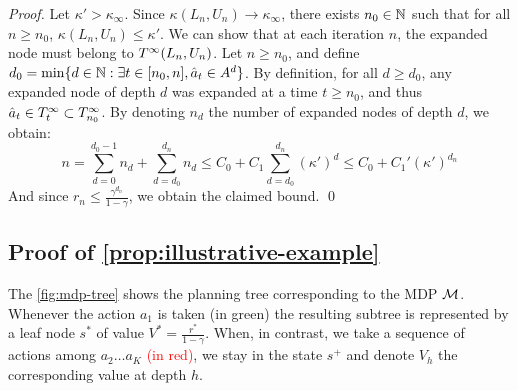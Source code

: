 \documentclass[runningheads]{llncs}
\begin{document}
\begin{proof}
Let $\kappa'>\kappa_\infty$. Since $\kappa(L_n,U_n)\rightarrow\kappa_\infty$, there exists $n_0\in\mathbb{N}$ such that for all $n\geq n_0$, $\kappa(L_n,U_n) \leq \kappa'$.
We can show that at each iteration $n$, the expanded node must belong to $T^\infty(L_n,U_n)$.
Let $n\geq n_0$, and define $d_0 = \min\{d\in\mathbb{N}: \exists t \in[n_0,n], \hat{a}_t\in A^d \}$. By definition, for all $d\geq d_0$, any expanded node of depth $d$ was expanded at a time $t\geq n_0$, and thus $\hat{a}_t\in T^\infty_t \subset T^\infty_{n_0}$. By denoting $n_d$ the number of expanded nodes of depth $d$, we obtain:
\[
n = \sum_{d=0}^{d_0-1}n_d + \sum_{d=d_0}^{d_n} n_d \leq  C_0 + C_1\sum_{d=d_0}^{d_n} (\kappa')^d \leq C_0 + C_1' (\kappa')^{d_n}
\]
And since $r_n \leq \frac{\gamma^{d_n}}{1-\gamma}$, we obtain the claimed bound.
\qed\end{proof}

\subsection{Proof of \autoref{prop:illustrative-example}}

The \autoref{fig:mdp-tree} shows the planning tree corresponding to the MDP $\mathcal{M}$. Whenever the action $a_1$ is taken \textcolor{OliveGreen}{(in green)} the resulting subtree is represented by a leaf node $s^*$ of value $V^* = \frac{r^*}{1-\gamma}$. When, in contrast, we take a sequence of actions among $a_2\dots a_K$ \textcolor{red}{(in red)}, we stay in the state $s^+$ and denote $V_h$ the corresponding value at depth $h$.
\end{document}
